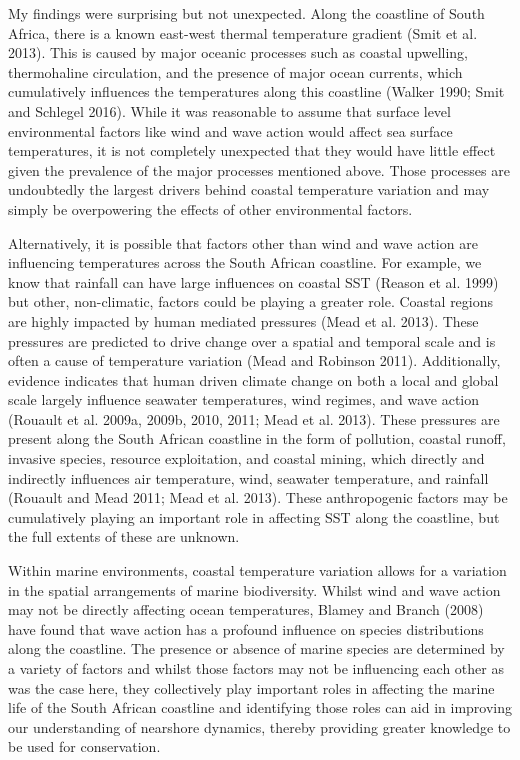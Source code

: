 \documentclass[12pt,]{article}
\begin{document}
My findings were surprising but not unexpected. Along the coastline of
South Africa, there is a known east-west thermal temperature gradient
(Smit et al. 2013). This is caused by major oceanic processes such as
coastal upwelling, thermohaline circulation, and the presence of major
ocean currents, which cumulatively influences the temperatures along
this coastline (Walker 1990; Smit and Schlegel 2016). While it was
reasonable to assume that surface level environmental factors like wind
and wave action would affect sea surface temperatures, it is not
completely unexpected that they would have little effect given the
prevalence of the major processes mentioned above. Those processes are
undoubtedly the largest drivers behind coastal temperature variation and
may simply be overpowering the effects of other environmental factors.

Alternatively, it is possible that factors other than wind and wave
action are influencing temperatures across the South African coastline.
For example, we know that rainfall can have large influences on coastal
SST (Reason et al. 1999) but other, non-climatic, factors could be
playing a greater role. Coastal regions are highly impacted by human
mediated pressures (Mead et al. 2013). These pressures are predicted to
drive change over a spatial and temporal scale and is often a cause of
temperature variation (Mead and Robinson 2011). Additionally, evidence
indicates that human driven climate change on both a local and global
scale largely influence seawater temperatures, wind regimes, and wave
action (Rouault et al. 2009a, 2009b, 2010, 2011; Mead et al. 2013).
These pressures are present along the South African coastline in the
form of pollution, coastal runoff, invasive species, resource
exploitation, and coastal mining, which directly and indirectly
influences air temperature, wind, seawater temperature, and rainfall
(Rouault and Mead 2011; Mead et al. 2013). These anthropogenic factors
may be cumulatively playing an important role in affecting SST along the
coastline, but the full extents of these are unknown.

Within marine environments, coastal temperature variation allows for a
variation in the spatial arrangements of marine biodiversity. Whilst
wind and wave action may not be directly affecting ocean temperatures,
Blamey and Branch (2008) have found that wave action has a profound
influence on species distributions along the coastline. The presence or
absence of marine species are determined by a variety of factors and
whilst those factors may not be influencing each other as was the case
here, they collectively play important roles in affecting the marine
life of the South African coastline and identifying those roles can aid
in improving our understanding of nearshore dynamics, thereby providing
greater knowledge to be used for conservation.
\end{document}
